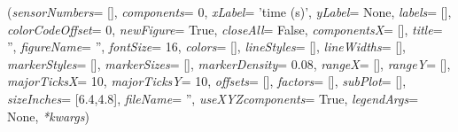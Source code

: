 \ei

%
\begin{flushleft}
\label{sec:mainsystemextensions:PlotSensor}
({\it sensorNumbers}= [], {\it components}= 0, {\it xLabel}= 'time (s)', {\it yLabel}= None, {\it labels}= [], {\it colorCodeOffset}= 0, {\it newFigure}= True, {\it closeAll}= False, {\it componentsX}= [], {\it title}= '', {\it figureName}= '', {\it fontSize}= 16, {\it colors}= [], {\it lineStyles}= [], {\it lineWidths}= [], {\it markerStyles}= [], {\it markerSizes}= [], {\it markerDensity}= 0.08, {\it rangeX}= [], {\it rangeY}= [], {\it majorTicksX}= 10, {\it majorTicksY}= 10, {\it offsets}= [], {\it factors}= [], {\it subPlot}= [], {\it sizeInches}= [6.4,4.8], {\it fileName}= '', {\it useXYZcomponents}= True, {\it legendArgs}= None, {\it **kwargs})
\end{flushleft}
\setlength{\itemindent}{0.7cm}
